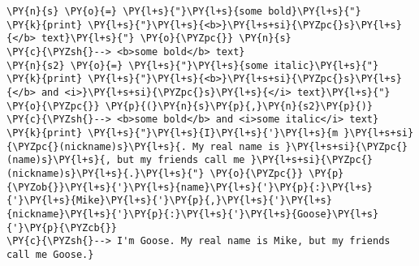 \begin{Verbatim}[commandchars=\\\{\}]
\PY{n}{s} \PY{o}{=} \PY{l+s}{"}\PY{l+s}{some bold}\PY{l+s}{"}
\PY{k}{print} \PY{l+s}{"}\PY{l+s}{<b>}\PY{l+s+si}{\PYZpc{}s}\PY{l+s}{</b> text}\PY{l+s}{"} \PY{o}{\PYZpc{}} \PY{n}{s}
\PY{c}{\PYZsh{}--> <b>some bold</b> text}
\PY{n}{s2} \PY{o}{=} \PY{l+s}{"}\PY{l+s}{some italic}\PY{l+s}{"}
\PY{k}{print} \PY{l+s}{"}\PY{l+s}{<b>}\PY{l+s+si}{\PYZpc{}s}\PY{l+s}{</b> and <i>}\PY{l+s+si}{\PYZpc{}s}\PY{l+s}{</i> text}\PY{l+s}{"} \PY{o}{\PYZpc{}} \PY{p}{(}\PY{n}{s}\PY{p}{,}\PY{n}{s2}\PY{p}{)}
\PY{c}{\PYZsh{}--> <b>some bold</b> and <i>some italic</i> text}
\PY{k}{print} \PY{l+s}{"}\PY{l+s}{I}\PY{l+s}{'}\PY{l+s}{m }\PY{l+s+si}{\PYZpc{}(nickname)s}\PY{l+s}{. My real name is }\PY{l+s+si}{\PYZpc{}(name)s}\PY{l+s}{, but my friends call me }\PY{l+s+si}{\PYZpc{}(nickname)s}\PY{l+s}{.}\PY{l+s}{"} \PY{o}{\PYZpc{}} \PY{p}{\PYZob{}}\PY{l+s}{'}\PY{l+s}{name}\PY{l+s}{'}\PY{p}{:}\PY{l+s}{'}\PY{l+s}{Mike}\PY{l+s}{'}\PY{p}{,}\PY{l+s}{'}\PY{l+s}{nickname}\PY{l+s}{'}\PY{p}{:}\PY{l+s}{'}\PY{l+s}{Goose}\PY{l+s}{'}\PY{p}{\PYZcb{}}
\PY{c}{\PYZsh{}--> I'm Goose. My real name is Mike, but my friends call me Goose.}
\end{Verbatim}
